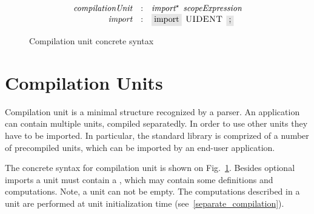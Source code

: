 \begin{figure}[t]
  \[
    \begin{array}{rcl}
      \defterm{compilationUnit}  & : & \nonterm{import}^\star\s\nonterm{scopeExpression}\\
      \defterm{import}           & : & \term{import}\s\token{UIDENT}\s\term{;}
    \end{array}
  \]
  \caption{Compilation unit concrete syntax}
  \label{compilation_unit}
\end{figure}

\section{Compilation Units}
\label{sec:compilation_units}

Compilation unit is a minimal structure recognized by a parser. An application can contain multiple units, compiled separatedly.
In order to use other units they have to be imported. In particular, the standard library is comprized of a number of precompiled units,
which can be imported by an end-user application.

The concrete syntax for compilation unit is shown on Fig.~\ref{compilation_unit}. Besides optional imports a unit must contain
a , which may contain some definitions and computations. Note, a unit can not be empty. The computations described in
a unit are performed at unit initialization time (see~\ref{separate_compilation}).

